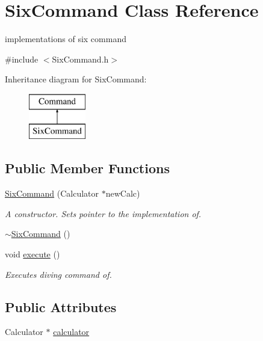 \hypertarget{class_six_command}{}\section{Six\+Command Class Reference}
\label{class_six_command}


implementations of six command  




{\ttfamily \#include $<$Six\+Command.\+h$>$}

Inheritance diagram for Six\+Command\+:\begin{figure}[H]
\begin{center}
\leavevmode
\includegraphics[height=2.000000cm]{class_six_command}
\end{center}
\end{figure}
\subsection*{Public Member Functions}
\begin{DoxyCompactItemize}
\item 
\hyperlink{class_six_command_aed104b7b3d32d680f6459fc7a124c5a3}{Six\+Command} (Calculator $\ast$new\+Calc)
\begin{DoxyCompactList}\small\item\em A constructor. Sets pointer to the implementation of. \end{DoxyCompactList}\item 
\hyperlink{class_six_command_ac2c319c9e53443ff2c4b00a1ccd05c6a}{$\sim$\+Six\+Command} ()
\item 
void \hyperlink{class_six_command_af34a36bfb4cfd411238144e0afce9d28}{execute} ()
\begin{DoxyCompactList}\small\item\em Executes diving command of. \end{DoxyCompactList}\end{DoxyCompactItemize}
\subsection*{Public Attributes}
\begin{DoxyCompactItemize}
\item 
Calculator $\ast$ \hyperlink{class_six_command_aaad9b0fc44a03f98f2de91a140f9a0c2}{calculator}
\end{DoxyCompactItemize}


